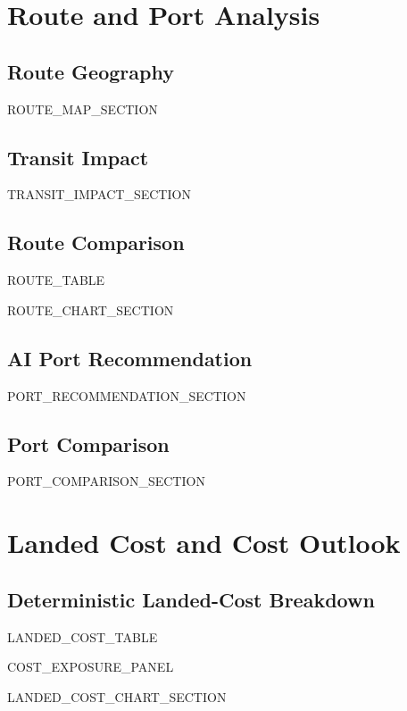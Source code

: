 \documentclass[10pt,a4paper]{article}
\begin{document}
\newpage

\section{Route and Port Analysis}

\subsection*{Route Geography}
{{ROUTE_MAP_SECTION}}

\subsection*{Transit Impact}
{{TRANSIT_IMPACT_SECTION}}

\subsection*{Route Comparison}
{{ROUTE_TABLE}}

\vspace{0.7em}
{{ROUTE_CHART_SECTION}}

\subsection*{AI Port Recommendation}
{{PORT_RECOMMENDATION_SECTION}}

\subsection*{Port Comparison}
{{PORT_COMPARISON_SECTION}}

\newpage

\section{Landed Cost and Cost Outlook}

\subsection*{Deterministic Landed-Cost Breakdown}
{{LANDED_COST_TABLE}}

\vspace{0.8em}
{{COST_EXPOSURE_PANEL}}

\vspace{0.8em}
{{LANDED_COST_CHART_SECTION}}

\vspace{0.9em}
\end{document}

